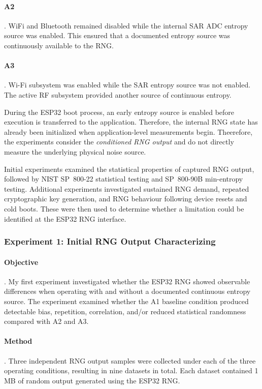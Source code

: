 \documentclass[a4paper, 12pt]{article}
\begin{document}
\paragraph{A2}. WiFi and Bluetooth remained disabled while the internal SAR
ADC entropy source was enabled. This ensured that a documented entropy source was continuously available to the RNG.

\paragraph{A3}. Wi-Fi subsystem was enabled while the SAR entropy source
was not enabled. The active RF subsystem provided another source of continuous entropy.

During the ESP32 boot process, an early entropy source
is enabled before execution is transferred to the application. Therefore, the internal RNG state has already been initialized when application-level
measurements begin. Theerefore, the experiments consider the \emph{conditioned RNG output} and do not directly measure the underlying physical noise source.

Initial experiments examined the statistical properties of captured RNG output, followed by NIST
SP~800-22 statistical testing and SP~800-90B min-entropy testing.
Additional experiments investigated sustained RNG demand, repeated
cryptographic key generation, and RNG behaviour following device resets and
cold boots. These were then used to determine whether a limitation could be identified at the ESP32 RNG interface.

\subsubsection{Experiment 1: Initial RNG Output Characterizing}

\paragraph{Objective}.
My first experiment investigated whether the ESP32 RNG showed observable
differences when operating with and without a documented
continuous entropy source. The experiment examined whether the
A1 baseline condition produced detectable bias, repetition, correlation, and/or
reduced statistical randomness compared with A2 and A3.

\paragraph{Method}.
Three independent RNG output samples were collected under each of the three
operating conditions, resulting in nine datasets in total. Each dataset
contained 1 MB of random output generated using the ESP32
RNG.
\end{document}

